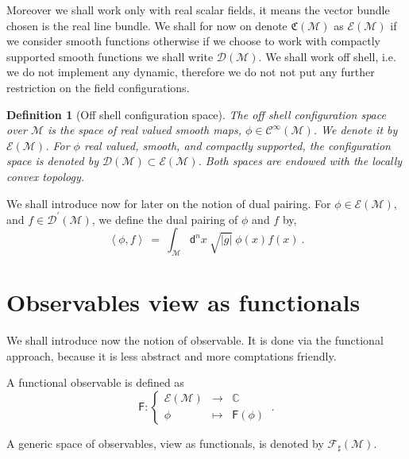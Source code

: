 \documentclass[10pt]{book}
\newcommand{\abs}[1]{\left|#1\right|}
\newcommand{\sm}[1]{\left\langle#1\right\rangle}
\let\int\int
\newcommand{\Ccal}{\mathcal{C}}
\newcommand{\Dcal}{\mathcal{D}}
\newcommand{\Ecal}{\mathcal{E}}
\newcommand{\Fcal}{\mathcal{F}}
\newcommand{\Mcal}{\mathcal{M}}
\newcommand{\Cbb}{\mathbb{C}}
\newcommand{\Crak}{\mathfrak{C}}
\newcommand{\Fsf}{\mathsf{F}}
\newcommand{\dsf}{\mathsf{d}}
\theoremstyle{break}
\newtheorem{definition}{Definition}
\begin{document}
\bigskip


Moreover  we shall work only with real scalar  fields, it means the vector bundle chosen is the real line bundle. We shall for now on denote $\Crak(\Mcal)$ as $\Ecal(\Mcal)$ if we consider smooth functions otherwise if we choose to work with compactly supported smooth functions we  shall write $\Dcal(\Mcal)$. We shall work off shell, i.e. we do not implement any dynamic, therefore we do not not put any further restriction on the field configurations.


\begin{definition}[Off shell configuration space]
The off shell configuration space over $\Mcal$ is the space of real valued smooth maps, $\phi \in \Ccal^\infty(\Mcal)$. We denote it by $\Ecal(\Mcal)$. For $\phi$ real valued, smooth, and compactly supported, the configuration space is denoted by $\Dcal(\Mcal) \subset \Ecal(\Mcal)$. Both spaces are endowed with the locally convex topology.
\end{definition}


We shall introduce now for later on the notion of dual pairing. For $\phi \in \mathcal{E}(\Mcal)$, and $f\in \mathcal{D}^{\prime}(\Mcal)$, we define the dual pairing of $\phi$ and $f$ by,
%
\begin{equation*}
\sm{\phi,f} \ = \ \int_{\Mcal} \dsf^n x \ \sqrt{\abs{g}} \ \phi(x) f(x) \ .
\end{equation*}


\section{Observables view as functionals}


We shall introduce now the notion of observable. It is done via the functional approach, because it is less abstract and more comptations friendly.


\bigskip

A functional observable is defined as 
%
\begin{equation*}
\Fsf : \left\{
\begin{array}{ccc}
\Ecal(\Mcal) & \to     & \Cbb \\
\phi  & \mapsto & \Fsf(\phi)
\end{array}
\right. \ . 
\end{equation*}

A generic space of observables, view as functionals, is denoted by $\Fcal_\sharp(\Mcal)$.
\end{document}

